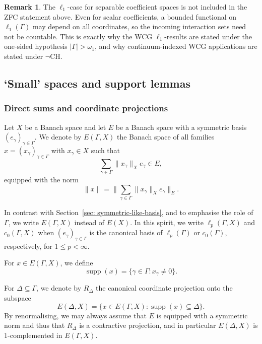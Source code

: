 \documentclass[11pt]{amsart}
\theoremstyle{plain}
\theoremstyle{definition}
\newtheorem{remark}[theorem]{Remark}
\numberwithin{equation}{section}
\newcommand{\norm}[1]{\lVert #1 \rVert}
\newcommand{\abs}[1]{\left|#1\right|}
\newcommand{\supp}{\operatorname{supp}}
\newcommand{\CH}{\mathrm{CH}}
\renewcommand{\le}{\leqslant}
\begin{document}
\begin{remark}
The \(\ell_1\)-case for separable coefficient spaces is not included in the ZFC statement above.  Even for scalar coefficients, a bounded functional on \(\ell_1(\Gamma)\) may depend on all coordinates, so the incoming interaction sets need not be countable.  This is exactly why the WCG \(\ell_1\)-results are stated under the one-sided hypothesis \(\abs{\Gamma}>\omega_1\), and why continuum-indexed WCG applications are stated under \(\neg\CH\).
\end{remark}

\subsection{`Small' spaces and support lemmas} 

\subsubsection{Direct sums and coordinate projections}

Let $X$ be a Banach space and let $E$ be a Banach space with a symmetric basis $(e_\gamma)_{\gamma \in \Gamma}$. We denote by $E(\Gamma, X)$ the Banach space of all families $x = (x_\gamma)_{\gamma \in \Gamma}$ with $x_\gamma \in X$ such that
\begin{equation*}
    \sum_{\gamma \in \Gamma} \norm{x_\gamma}_X e_\gamma \in E,
\end{equation*}
equipped with the norm
\begin{equation*}
    \norm{x} = \norm{\sum_{\gamma \in \Gamma} \norm{x_\gamma}_X e_\gamma}_E.
\end{equation*}

In contrast with Section~\ref{sec: symmetric-like-basis}, and to emphasise the role of $\Gamma$, we write $E(\Gamma, X)$ instead of $E(X)$. In this spirit, we write $\ell_p(\Gamma, X)$ and $c_0(\Gamma, X)$ when $(e_\gamma)_{\gamma \in \Gamma}$ is the canonical basis of $\ell_p(\Gamma)$ or $c_0(\Gamma)$, respectively, for $1 \le p < \infty$.

For $x \in E(\Gamma, X)$, we define
\begin{equation*}
\supp(x) = \{ \gamma \in \Gamma : x_\gamma \neq 0 \}.
\end{equation*} 

For $\Delta \subseteq \Gamma$, we denote by $R_\Delta$ the canonical coordinate projection onto the subspace
\begin{equation*}
E(\Delta, X) = \{ x \in E(\Gamma, X) : \supp(x) \subseteq \Delta  \}.
\end{equation*}
By renormalising, we may always assume that $E$ is equipped with a symmetric norm and thus that $R_\Delta$ is a contractive projection, and in particular $E(\Delta, X)$ is $1$-complemented in $E(\Gamma, X)$.
\end{document}
